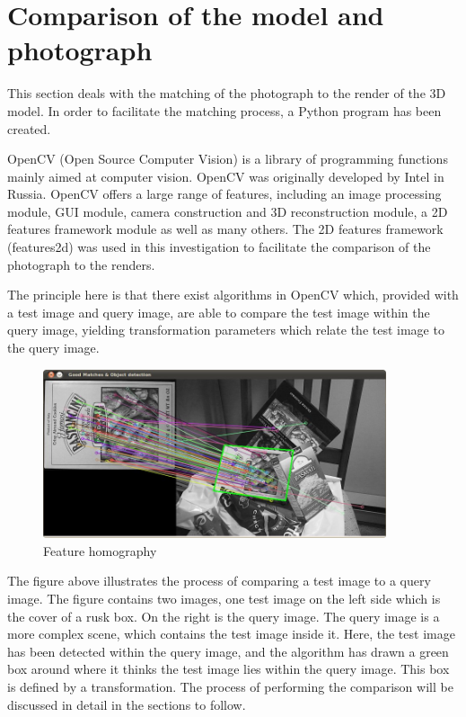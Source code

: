 \documentclass[11pt,a4paper]{report}
\begin{document}
		\section{Comparison of the model and photograph}
			This section deals with the matching of the photograph to the render of the 3D model. In order to facilitate the matching process, a Python program has been created.
			
			OpenCV (Open Source Computer Vision) is a library of programming functions mainly aimed at computer vision. OpenCV was originally developed by Intel in Russia. OpenCV offers a large range of features, including an image processing module, GUI module, camera construction and 3D reconstruction module, a 2D features framework module as well as many others. The 2D features framework (features2d) was used in this investigation to facilitate the comparison of the photograph to the renders. 
			
			The principle here is that there exist algorithms in OpenCV which, provided with a test image and query image, are able to compare the test image within the query image, yielding transformation parameters which relate the test image to the query image.
			
			\begin{figure}[h!]
				\centering
				\includegraphics[width=0.9\textwidth]{feature_homography_example}
				\caption{Feature homography}
			\end{figure}
			
			The figure above illustrates the process of comparing a test image to a query image. The figure contains two images, one test image on the left side which is the cover of a rusk box. On the right is the query image. The query image is a more complex scene, which contains the test image inside it. Here, the test image has been detected within the query image, and the algorithm has drawn a green box around where it thinks the test image lies within the query image. This box is defined by a transformation. The process of performing the comparison will be discussed in detail in the sections to follow.
			
\end{document}
